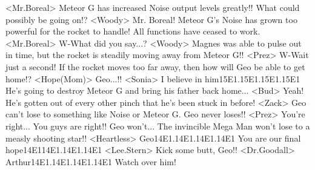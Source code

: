 <Mr.Boreal> Meteor G has increased Noise output levels greatly!! 
What could possibly be going on!? 
<Woody> Mr. Boreal! 
Meteor G's Noise has grown too powerful for the rocket to handle! 
All functions have ceased to work. 
<Mr.Boreal> W-What did you say...? 
<Woody> Magnes was able to pulse out in time, but the rocket 
is steadily moving away from Meteor G!! 
<Prez> W-Wait just a second! 
If the rocket moves too far away, then how will Geo be able to get home!? 
<Hope(Mom)> Geo...!! 
<Sonia> I believe in him{15}{E1}.{15}{E1}.{15}{E1}.{15}{E1} 
He's going to destroy Meteor G and bring his father back home... 
<Bud> Yeah! 
He's gotten out of every other pinch that he's been stuck in before! 
<Zack> Geo can't lose to something like Noise or Meteor G. 
Geo never loses!! 
<Prez> You're right... You guys are right!! 
Geo won't... 
The invincible Mega Man won't lose to a measly shooting star!! 
<Heartless> Geo{14}{E1}.{14}{E1}.{14}{E1}.{14}{E1} You are our final hope{14}{E1}{14}{E1}.{14}{E1}.{14}{E1} 
<Lee.Stern> Kick some butt, Geo!! 
<Dr.Goodall> Arthur{14}{E1}.{14}{E1}.{14}{E1}.{14}{E1} 
Watch over him! 
